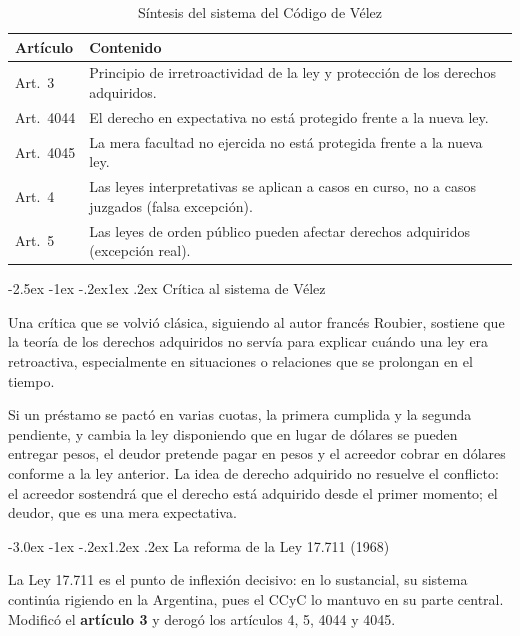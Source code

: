 \documentclass[12pt,oneside]{book}
\makeatletter
\renewcommand\section{\@startsection{section}{1}{\z@}%
  {-3.0ex \@plus -1ex \@minus -.2ex}{1.2ex \@plus .2ex}%
  {\normalfont\large\bfseries\color{acento}}}
\renewcommand\subsection{\@startsection{subsection}{2}{\z@}%
  {-2.5ex \@plus -1ex \@minus -.2ex}{1ex \@plus .2ex}%
  {\normalfont\normalsize\bfseries}}
\makeatother
\begin{document}
\begin{table}[H]
\centering
\begin{tabularx}{\textwidth}{B{0.17\textwidth} Y}
\toprule
\textbf{Artículo} & \textbf{Contenido} \\
\midrule
Art.~3 & Principio de irretroactividad de la ley y protección de los derechos adquiridos. \\
Art.~4044 & El derecho en expectativa no está protegido frente a la nueva ley. \\
Art.~4045 & La mera facultad no ejercida no está protegida frente a la nueva ley. \\
Art.~4 & Las leyes interpretativas se aplican a casos en curso, no a casos juzgados (falsa excepción). \\
Art.~5 & Las leyes de orden público pueden afectar derechos adquiridos (excepción real). \\
\bottomrule
\end{tabularx}
\caption{Síntesis del sistema del Código de Vélez}
\end{table}

\subsection{Crítica al sistema de Vélez}

Una crítica que se volvió clásica, siguiendo al autor francés Roubier, sostiene que la teoría de los derechos adquiridos no servía para explicar cuándo una ley era retroactiva, especialmente en situaciones o relaciones que se prolongan en el tiempo.

\begin{ejemplo}
Si un préstamo se pactó en varias cuotas, la primera cumplida y la segunda pendiente, y cambia la ley disponiendo que en lugar de dólares se pueden entregar pesos, el deudor pretende pagar en pesos y el acreedor cobrar en dólares conforme a la ley anterior. La idea de derecho adquirido no resuelve el conflicto: el acreedor sostendrá que el derecho está adquirido desde el primer momento; el deudor, que es una mera expectativa.
\end{ejemplo}

\section{La reforma de la Ley 17.711 (1968)}

La Ley 17.711 es el punto de inflexión decisivo: en lo sustancial, su sistema continúa rigiendo en la Argentina, pues el CCyC lo mantuvo en su parte central. Modificó el \textbf{artículo 3} y derogó los artículos 4, 5, 4044 y 4045.
\end{document}
